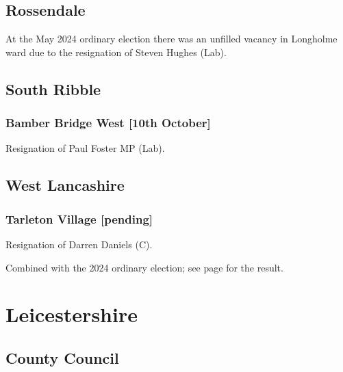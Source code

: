 \documentclass[a4paper,openany]{book}
\begin{document}
\begin{resultsiii}
\subsection*{Rossendale}

At the May 2024 ordinary election there was an unfilled vacancy in Longholme ward due to the resignation of Steven Hughes (Lab).%

\subsection*{South Ribble}

\subsubsection*{Bamber Bridge West \hspace*{\fill}\nolinebreak[1]%
	\enspace\hspace*{\fill}
	[10th October]}


Resignation of Paul Foster MP (Lab).

\subsection*{West Lancashire}

\subsubsection*{Tarleton Village \hspace*{\fill}\nolinebreak[1]%
	\enspace\hspace*{\fill}
	[pending]}


Resignation of Darren Daniels (C).

Combined with the 2024 ordinary election; see page \pageref{TarletonVillageWLancs} for the result.

\section{Leicestershire}

\subsection*{County Council}


\end{resultsiii}
\end{document}
